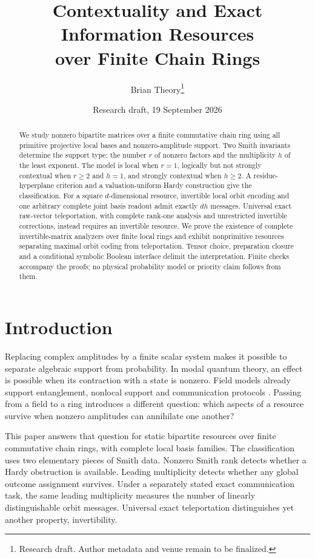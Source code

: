 \documentclass[11pt]{article}
\title{Contextuality and Exact Information Resources\\over Finite Chain Rings}
\author{Brian Theory\thanks{Research draft. Author metadata and venue remain to be finalized.}}
\date{Research draft, 19 September 2026}
\theoremstyle{definition}\newtheorem{definition}[theorem]{Definition}
\theoremstyle{remark}\newtheorem{remark}[theorem]{Remark}
\begin{document}
\maketitle
\begin{abstract}
We study nonzero bipartite matrices over a finite commutative chain ring using all primitive projective local bases and nonzero-amplitude support. Two Smith invariants determine the support type: the number $r$ of nonzero factors and the multiplicity $h$ of the least exponent. The model is local when $r=1$, logically but not strongly contextual when $r\geq2$ and $h=1$, and strongly contextual when $h\geq2$. A residue-hyperplane criterion and a valuation-uniform Hardy construction give the classification. For a square $d$-dimensional resource, invertible local orbit encoding and one arbitrary complete joint basis readout admit exactly $dh$ messages. Universal exact raw-vector teleportation, with complete rank-one analysis and unrestricted invertible corrections, instead requires an invertible resource. We prove the existence of complete invertible-matrix analyzers over finite local rings and exhibit nonprimitive resources separating maximal orbit coding from teleportation. Tensor choice, preparation closure and a conditional symbolic Boolean interface delimit the interpretation. Finite checks accompany the proofs; no physical probability model or priority claim follows from them.
\end{abstract}

\section{Introduction}
Replacing complex amplitudes by a finite scalar system makes it possible to separate algebraic support from probability. In modal quantum theory, an effect is possible when its contraction with a state is nonzero. Field models already support entanglement, nonlocal support and communication protocols \cite{Schumacher2010,Schumacher2012}. Passing from a field to a ring introduces a different question: which aspects of a resource survive when nonzero amplitudes can annihilate one another?

This paper answers that question for static bipartite resources over finite commutative chain rings, with complete local basis families. The classification uses two elementary pieces of Smith data. Nonzero Smith rank detects whether a Hardy obstruction is available. Leading multiplicity detects whether any global outcome assignment survives. Under a separately stated exact communication task, the same leading multiplicity measures the number of linearly distinguishable orbit messages. Universal exact teleportation distinguishes yet another property, invertibility.
\end{document}
